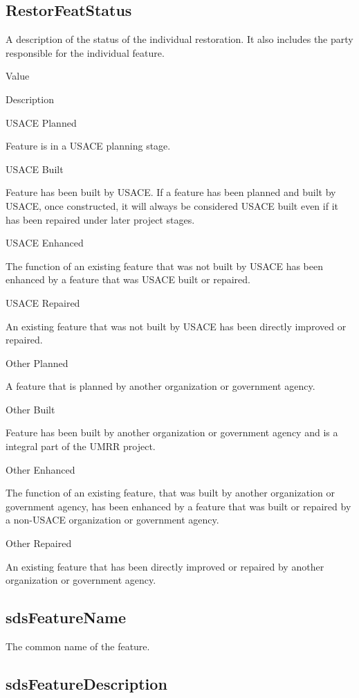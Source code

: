\documentclass[
  letterpaper,
  DIV=11,
  numbers=noendperiod]{scrreprt}
\begin{document}
\subsection{RestorFeatStatus}\label{restorfeatstatus-2}

A description of the status of the individual restoration. It also
includes the party responsible for the individual feature.

Value

Description

USACE Planned

Feature is in a USACE planning stage.

USACE Built

Feature has been built by USACE. If a feature has been planned and built
by USACE, once constructed, it will always be considered USACE built
even if it has been repaired under later project stages.

USACE Enhanced

The function of an existing feature that was not built by USACE has been
enhanced by a feature that was USACE built or repaired.

USACE Repaired

An existing feature that was not built by USACE has been directly
improved or repaired.

Other Planned

A feature that is planned by another organization or government agency.

Other Built

Feature has been built by another organization or government agency and
is a integral part of the UMRR project.

Other Enhanced

The function of an existing feature, that was built by another
organization or government agency, has been enhanced by a feature that
was built or repaired by a non-USACE organization or government agency.

Other Repaired

An existing feature that has been directly improved or repaired by
another organization or government agency.

\subsection{sdsFeatureName}\label{sdsfeaturename-2}

The common name of the feature.

\subsection{sdsFeatureDescription}\label{sdsfeaturedescription-2}
\end{document}
